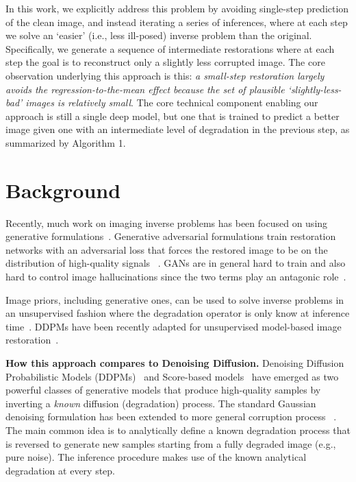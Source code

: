 \documentclass[10pt]{article} %
\begin{document}
In this work, we explicitly address this problem by avoiding single-step prediction of the clean image, and instead iterating a series of inferences, where at each step we solve an `easier' (i.e., less ill-posed) inverse problem than the original. Specifically, we generate a sequence of intermediate restorations where at each step the goal is to reconstruct only a slightly less corrupted image. The core observation underlying this approach is this: \emph{a small-step restoration largely avoids the regression-to-the-mean effect because the set of plausible `slightly-less-bad' images is relatively small}. The core technical component enabling our approach is still a single deep model, but one that is trained to predict a better image given one with an intermediate level of degradation in the previous step, as summarized by Algorithm 1.

\section{Background}
\label{sec:background}

Recently, much work on imaging inverse problems has been focused on using generative formulations~\citep{bora2017compressed, kawar2022denoising}. Generative adversarial formulations train restoration networks with an adversarial loss that forces the restored image to be on the distribution of high-quality signals
~\citep{kupyn2018deblurgan,kupyn2019deblurgan,asim2020blind}. GANs are in general hard to train and also hard to control image hallucinations since the two terms play an antagonic role~\citep{lugmayr2021ntire}. 

Image priors, including generative ones, can be used to solve inverse problems in an unsupervised fashion where the degradation operator is only know at inference time~\citep{rudin1994total,venkatakrishnan2013plug,delbracio2021polyblur,romano2017little,ongie2020deep}. DDPMs have been recently adapted for unsupervised model-based image restoration~\citep{kawar2021snips,kawar2022denoising,kadkhodaie2021stochastic,jalal2021robust,laumont2022bayesian,chung2022improving,kawar2022denoising}.

\noindent \textbf{How this approach compares to Denoising Diffusion.}
Denoising Diffusion Probabilistic Models (DDPMs)~\citep{sohl2015deep, ho2020denoising, song2021denoising} and Score-based models~\citep{ncsn, ncsnv2, ncsnv3} have emerged as two powerful classes of generative models that produce high-quality samples by inverting a \emph{known} diffusion (degradation) process. The standard Gaussian denoising formulation has been extended to more general corruption process
~\citep{bansal2022cold, hoogeboom2022blurring, daras2023soft, deasy2021heavy, hoogeboom2022autoregressive, hoogeboom2022equivariant, nachmani2021denoising, johnson2021beyond, lee2022progressive, ye2022hitting}. The main common idea is to analytically define a known degradation process that is reversed to generate new samples starting from a fully degraded image (e.g., pure noise). The inference procedure makes use of the known analytical degradation at every step.
\end{document}

